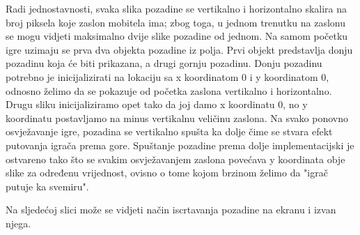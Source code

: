 \documentclass[times, utf8, zavrsni]{fer}
\begin{document}
	Radi jednostavnosti, svaka slika pozadine se  vertikalno i horizontalno skalira na broj piksela koje zaslon mobitela ima; zbog toga, u jednom trenutku na zaslonu se mogu vidjeti maksimalno dvije slike
	pozadine od jednom. Na samom početku igre uzimaju se prva dva objekta pozadine iz polja. Prvi objekt predstavlja donju pozadinu koja će biti prikazana, a drugi gornju pozadinu.  Donju pozadinu potrebno je inicijalizirati
	na lokaciju sa x koordinatom 0 i y koordinatom 0, odnosno želimo da se pokazuje od početka zaslona vertikalno i horizontalno. Drugu sliku inicijaliziramo opet tako da joj damo x koordinatu 0, no y koordinatu postavljamo
	na minus vertikalnu veličinu zaslona. Na svako ponovno osvježavanje igre, pozadina se vertikalno spušta ka dolje čime se stvara efekt putovanja igrača prema gore. Spuštanje pozadine prema dolje implementacijski je 
	ostvareno tako što se svakim osvježavanjem zaslona povećava y koordinata obje slike za određenu vrijednost, ovisno o tome kojom brzinom želimo da "igrač putuje ka svemiru". 
	
	Na sljedećoj slici može se vidjeti način iscrtavanja pozadine na ekranu i izvan njega.
	
\end{document}
